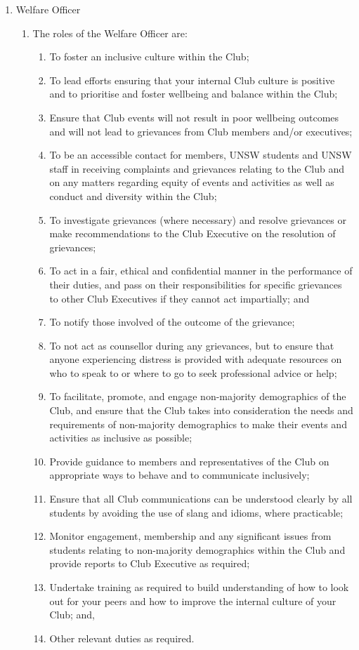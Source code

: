 \begin{enumerate}
\item Welfare Officer
  \begin{enumerate}
  \item The roles of the Welfare Officer are:
    \begin{enumerate}
    \item To foster an inclusive culture within the Club;
    \item To lead efforts ensuring that your internal Club culture is positive and to prioritise and foster wellbeing and balance within the Club;
    \item Ensure that Club events will not result in poor wellbeing outcomes and will not lead to grievances from Club members and/or executives;
    \item To be an accessible contact for members, UNSW students and UNSW staff in receiving complaints and grievances relating to the Club and on any matters regarding equity of events and activities as well as conduct and diversity within the Club;
    \item To investigate grievances (where necessary) and resolve grievances or make recommendations to the Club Executive on the resolution of grievances;
    \item To act in a fair, ethical and confidential manner in the performance of their duties, and pass on their responsibilities for specific grievances to other Club Executives if they cannot act impartially; and
    \item To notify those involved of the outcome of the grievance;
    \item To not act as counsellor during any grievances, but to ensure that anyone experiencing distress is provided with adequate resources on who to speak to or where to go to seek professional advice or help;
    \item To facilitate, promote, and engage non-majority demographics of the Club, and ensure that the Club takes into consideration the needs and requirements of non-majority demographics to make their events and activities as inclusive as possible;
    \item Provide guidance to members and representatives of the Club on appropriate ways to behave and to communicate inclusively;
    \item Ensure that all Club communications can be understood clearly by all students by avoiding the use of slang and idioms, where practicable;
    \item Monitor engagement, membership and any significant issues from students relating to non-majority demographics within the Club and provide reports to Club Executive as required;
    \item Undertake training as required to build understanding of how to look out for your peers and how to improve the internal culture of your Club; and,
    \item Other relevant duties as required.
    \end{enumerate}
  \end{enumerate}


\end{enumerate}
